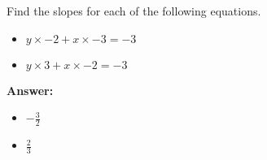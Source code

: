  Find the slopes for each of the following equations. \begin{itemize}\item \( y \times -2 + x \times -3 = -3 \)\item \( y \times 3 + x \times -2 = -3 \)\end{itemize}

        \textbf{Answer:} \begin{itemize}\item \( -\frac{3}{2} \)\item \( \frac{2}{3} \)\end{itemize}
